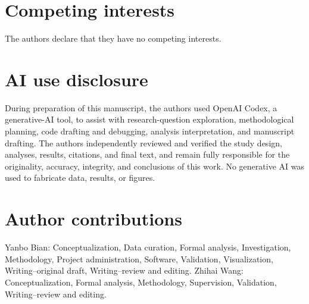 \documentclass[research]{fcs}
\begin{document}
\section*{Competing interests}
The authors declare that they have no competing interests.

\section*{AI use disclosure}
During preparation of this manuscript, the authors used OpenAI Codex, a generative-AI tool, to assist with research-question exploration, methodological planning, code drafting and debugging, analysis interpretation, and manuscript drafting. The authors independently reviewed and verified the study design, analyses, results, citations, and final text, and remain fully responsible for the originality, accuracy, integrity, and conclusions of this work. No generative AI was used to fabricate data, results, or figures.

\section*{Author contributions}
Yanbo Bian: Conceptualization, Data curation, Formal analysis, Investigation, Methodology, Project administration, Software, Validation, Visualization, Writing--original draft, Writing--review and editing. Zhihai Wang: Conceptualization, Formal analysis, Methodology, Supervision, Validation, Writing--review and editing.



\end{document}
